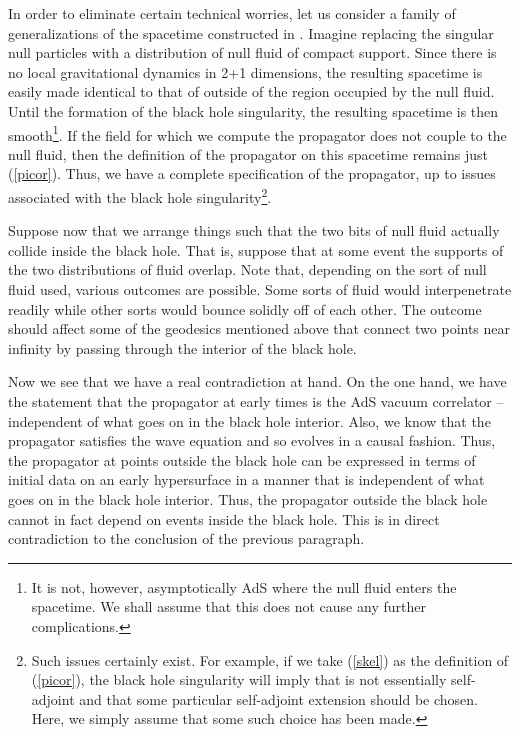 \documentclass[a4paper,12pt]{article}
\begin{document}
In order to eliminate certain technical worries, let us consider a
family of generalizations of the spacetime constructed in
\cite{holopart}.  Imagine replacing the singular null particles with a
distribution of null fluid of compact support.  Since there is no
local gravitational dynamics in 2+1 dimensions, the resulting
spacetime is easily made identical to that of \cite{holopart} outside
of the region occupied by the null fluid.  Until the formation of the
black hole singularity, the resulting spacetime is then
smooth\footnote{It is not, however, asymptotically AdS where the null
  fluid enters the spacetime.  We shall assume that this does not
  cause any further complications.}.  If the field \myHighlight{$\phi$}\coordHE{} for which we
compute the propagator does not couple to the null fluid, then the
definition of the propagator on this spacetime remains just
(\ref{picor}).  Thus, we have a complete specification of the
propagator, up to issues associated with the black hole
singularity\footnote{Such issues certainly exist.  For example, if we
  take (\ref{skel}) as the definition of (\ref{picor}), the black hole
  singularity will imply that \coordHE{} is not essentially self-adjoint and
  that some particular self-adjoint extension should be chosen.  Here,
  we simply assume that some such choice has been made.}.

Suppose now that we arrange things such that the two bits of null
fluid actually collide inside the black hole.  That is, suppose that
at some event the supports of the two distributions of fluid overlap.
Note that, depending on the sort of null fluid used, various outcomes
are possible.  Some sorts of fluid would interpenetrate readily while
other sorts would bounce solidly off of each other.  The outcome
should affect some of the geodesics mentioned above that connect two
points near infinity by passing through the interior of the black
hole.

Now we see that we have a real contradiction at hand.  On the one
hand, we have the statement that the propagator at early times is the
AdS vacuum correlator -- independent of what goes on in the black hole
interior.  Also, we know that the propagator satisfies the wave
equation and so evolves in a causal fashion.  Thus, the propagator at
points outside the black hole can be expressed in terms of initial
data on an early hypersurface in a manner that is independent of what
goes on in the black hole interior.  Thus, the propagator outside the
black hole cannot in fact depend on events inside the black hole.
This is in direct contradiction to the conclusion of the previous
paragraph. 
\end{document}
